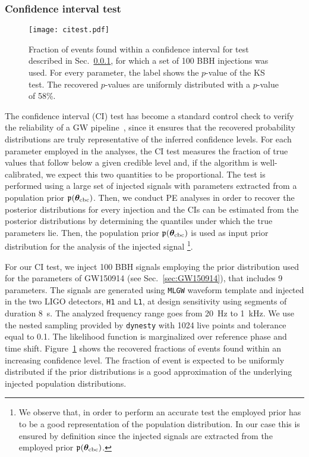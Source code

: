 \documentclass[prd,aps,twocolumn,a4paper,showkeys,nofootinbib,floatfix]{revtex4-1}
\def\params{\boldsymbol{\theta}}
\begin{document}
\subsubsection{Confidence interval test}
\label{sec:citest}

\begin{figure}[t]
	\centering 
	\texttt{[image: citest.pdf]}	
	\caption{Fraction of events found within a confidence interval 
					for test described in Sec.~\ref{sec:citest},
					for which a set of 100 BBH injections was used. 
					For every parameter, the label shows the $p$-value of the
					KS test. The recovered $p$-values are 
					uniformly distributed with a $p$-value of 58\%.}
	\label{fig:ci}
\end{figure}

The confidence interval (CI) test has become a standard control check to verify the reliability of a GW pipeline~\citep[e.g.][]{Veitch:2014wba,DelPozzo:2018dpu,Romero-Shaw:2020owr},
since it ensures that
the recovered probability distributions are truly 
representative of the inferred confidence levels.
For each parameter employed in the analyses,
the CI test measures the fraction of true values that follow below 
a given credible level and, if the algorithm is well-calibrated,
we expect this two quantities to be proportional. 
The test is performed using a large set of injected signals 
with parameters extracted from a population prior $\mathfrak{p}(\params_{\rm cbc})$.
Then, we conduct PE analyses in order to recover 
the posterior distributions for every injection and
the CIs can be estimated from the posterior distributions by determining the
quantiles under which the true parameters lie.
Then, the population prior
$\mathfrak{p}(\params_{\rm cbc})$ is used as input prior distribution
for the analysis of the injected signal
\footnote{We observe that, in order to perform an accurate test 
	the employed prior has to be a good representation of the population distribution. In our case this is ensured by definition since the injected 
	signals are extracted from the employed prior $\mathfrak{p}(\params_{\rm cbc})$.}.

For our CI test, we inject 100 BBH signals 
employing the prior distribution used for the parameters of 
GW150914 (see Sec.~\ref{sec:GW150914}), that includes 9 parameters.
The signals are generated using {\tt MLGW} waveform template
and injected in the two LIGO detectors, 
{\tt H1} and {\tt L1}, at design sensitivity
using segments of duration 8~s.
The analyzed frequency range goes from 20~Hz to 1~kHz.
We use the nested sampling provided by {\tt dynesty} with 1024 live points 
and tolerance equal to 0.1.
The likelihood function is marginalized over reference phase and time shift.
Figure~\ref{fig:ci} shows the recovered fractions of events found within 
an increasing confidence level.
The fraction of event is expected to be uniformly distributed
if the prior distributions is a good approximation of the 
underlying injected population distributions.
\end{document}
